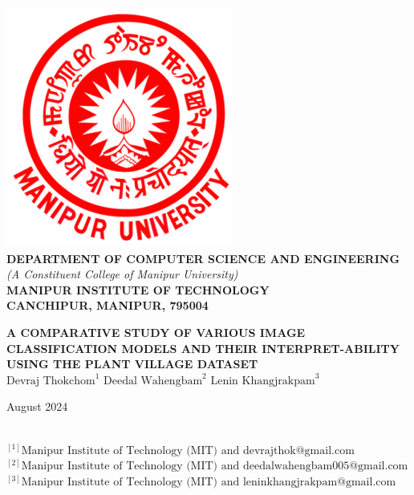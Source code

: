 \documentclass[12pt, oneside, a4paper]{book}
\begin{document}
\begingroup
    \begin{center}
        \includegraphics[scale=0.4]{graphics/MU Logo.png}\\[0.5em]
        \color{red}\large \textbf{DEPARTMENT OF COMPUTER SCIENCE AND ENGINEERING}\\
        \color{black}\normalsize \textit{(A Constituent College of Manipur University)}\\
        \color{red}\textbf{\large MANIPUR INSTITUTE OF TECHNOLOGY}\\
        \large \textbf{CANCHIPUR, MANIPUR, 795004}
    \end{center}
\endgroup
\restoregeometry
{}


\newpage
    \begin{center}
        \large \textbf{A COMPARATIVE STUDY OF VARIOUS IMAGE CLASSIFICATION MODELS AND THEIR INTERPRET-ABILITY USING THE PLANT VILLAGE DATASET} \\
        \vspace{1em}
        \large $\text{Devraj Thokchom}^1$ \space \space \space $\text{Deedal Wahengbam}^2$ \space \space \space $\text{Lenin Khangjrakpam}^3$ \par
        \vspace{0.5em}
        August 2024  
    \end{center}

    \vspace*{\fill}
    \par\vspace{-.5\ht\strutbox}\noindent\hrulefill\\
    ${}^{[1]} \text{Manipur Institute of Technology (MIT) and devrajthok@gmail.com}$\\
    ${}^{[2]} \text{Manipur Institute of Technology (MIT) and deedalwahengbam005@gmail.com }$\\
    ${}^{[3]} \text{Manipur Institute of Technology (MIT) and leninkhangjrakpam@gmail.com}$\\
    
\end{document}
